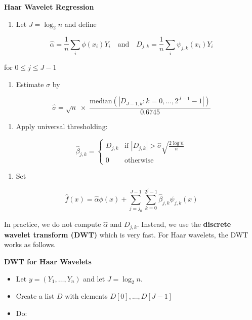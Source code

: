 \textbf{Haar Wavelet Regression}

\begin{enumerate}[tightlist,label={\arabic*.}]
\item
  Let \(J = \log_{2} n\) and define
\end{enumerate}

\[ \hat{\alpha} = \frac{1}{n} \sum_{i} \phi(x_{i}) Y_{i}
\quad \text{and} \quad
D_{j, k} = \frac{1}{n} \sum_{i} \psi_{j, k}(x_{i}) Y_{i}
\]

for \(0 \leq j \leq J - 1\)

\begin{enumerate}[tightlist,label={\arabic*.}]
\item
  Estimate \(\sigma\) by
\end{enumerate}

\[ \hat{\sigma} = \sqrt{n} \; \times \; \frac{\text{median} \left( \left| D_{J-1, k} : k = 0, \dots, 2^{J - 1} - 1\right| \right)}{0.6745} \]

\begin{enumerate}[tightlist,label={\arabic*.},resume]
\item
  Apply universal thresholding:
\end{enumerate}

\[ \hat{\beta}_{j, k} = \begin{cases}
D_{j, k} & \text{if } \left| D_{j, k} \right| > \hat{\sigma} \sqrt{\frac{2 \log n}{n}} \\
0 & \text{otherwise}
\end{cases}\]

\begin{enumerate}[tightlist,label={\arabic*.},resume]
\item
  Set
\end{enumerate}

\[ \hat{f}(x) = \hat{\alpha} \phi(x) + \sum_{j = j_{0}}^{J - 1} \sum_{k = 0}^{2^{j} - 1} \hat{\beta}_{j, k} \psi_{j, k}(x) \]

In practice, we do not compute \(\hat{\alpha}\) and \(D_{j, k}\).
Instead, we use the \textbf{discrete wavelet transform (DWT)} which is
very fast. For Haar wavelets, the DWT works as follows.

\textbf{DWT for Haar Wavelets}

\begin{itemize}[tightlist]
\item
  Let \(y = (Y_{1}, \dots, Y_{n})\) and let \(J = \log_{2} n\).\\
\item
  Create a list \(D\) with elements \(D[0], ..., D[J - 1]\)
\item
  Do:
\end{itemize}

